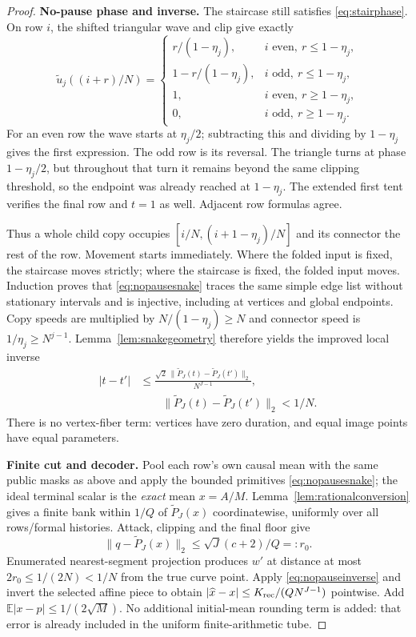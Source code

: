 \documentclass[11pt,letterpaper]{article}
\theoremstyle{definition}\newtheorem{definition}[theorem]{Definition}
\theoremstyle{remark}\newtheorem{remark}[theorem]{Remark}
\newcommand{\E}{\mathbb{E}}
\begin{document}
\begin{proof}
\smallskip\noindent\textbf{No-pause phase and inverse.}
The staircase still satisfies \eqref{eq:stairphase}. On row $i$, the shifted triangular wave and clip give exactly
\[
 \widetilde u_j((i+r)/N)=
 \begin{cases}
 r/(1-\eta_j),& i\text{ even},\ r\le1-\eta_j,\\
 1-r/(1-\eta_j),& i\text{ odd},\ r\le1-\eta_j,\\
 1,&i\text{ even},\ r\ge1-\eta_j,\\
 0,&i\text{ odd},\ r\ge1-\eta_j.
 \end{cases}
\]
For an even row the wave starts at $\eta_j/2$; subtracting this and dividing by $1-\eta_j$ gives the first expression. The odd row is its reversal. The triangle turns at phase $1-\eta_j/2$, but throughout that turn it remains beyond the same clipping threshold, so the endpoint was already reached at $1-\eta_j$. The extended first tent verifies the final row and $t=1$ as well. Adjacent row formulas agree.

Thus a whole child copy occupies $[i/N,(i+1-\eta_j)/N]$ and its connector the rest of the row. Movement starts immediately. Where the folded input is fixed, the staircase moves strictly; where the staircase is fixed, the folded input moves. Induction proves that \eqref{eq:nopausesnake} traces the same simple edge list without stationary intervals and is injective, including at vertices and global endpoints. Copy speeds are multiplied by $N/(1-\eta_j)\ge N$ and connector speed is $1/\eta_j\ge N^{j-1}$. Lemma~\ref{lem:snakegeometry} therefore yields the improved local inverse
\begin{equation}\label{eq:nopauseinverse}
 \begin{aligned}
 |t-t'|&\le\frac{\sqrt2\,\|\widetilde P_J(t)-\widetilde P_J(t')\|_2}
                         {N^{J-1}},\\
 &\hspace{2em}\|\widetilde P_J(t)-\widetilde P_J(t')\|_2<1/N.
 \end{aligned}
\end{equation}
There is no vertex-fiber term: vertices have zero duration, and equal image points have equal parameters.

\smallskip\noindent\textbf{Finite cut and decoder.}
Pool each row's own causal mean with the same public masks as above and apply the bounded primitives \eqref{eq:nopausesnake}; the ideal terminal scalar is the \emph{exact} mean $x=A/M$. Lemma~\ref{lem:rationalconversion} gives a finite bank within $1/Q$ of $\widetilde P_J(x)$ coordinatewise, uniformly over all rows/formal histories. Attack, clipping and the final floor give
\[
 \|q-\widetilde P_J(x)\|_2\le\sqrt J(c+2)/Q=:r_0.
\]
Enumerated nearest-segment projection produces $w'$ at distance at most $2r_0\le1/(2N)<1/N$ from the true curve point. Apply \eqref{eq:nopauseinverse} and invert the selected affine piece to obtain
$|\widehat x-x|\le K_{\rm rec}/(QN^{J-1})$ pointwise. Add $\E|x-p|\le1/(2\sqrt M)$. No additional initial-mean rounding term is added: that error is already included in the uniform finite-arithmetic tube.


\end{proof}
\end{document}
